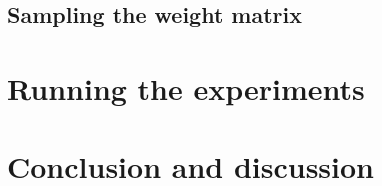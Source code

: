 \documentclass[11pt]{article}
\begin{document}
    \subsection{Sampling the weight matrix}\label{subsec:sampling-the-weight-matrix}


    \section{Running the experiments}\label{sec:running-the-experiments}


    \section{Conclusion and discussion}\label{sec:conclusion-and-discussion}

    
    
\end{document}
